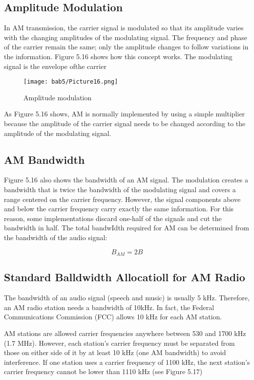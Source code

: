 \subsection{Amplitude Modulation}
In AM transmission, the carrier signal is modulated so that its amplitude varies with the changing amplitudes of the modulating signal. The frequency and phase of the carrier remain the same; only the amplitude changes to follow variations in the information. Figure 5.16 shows how this concept works. The modulating signal is the envelope ofthe carrier

\begin{figure}
  \centering
  \texttt{[image: bab5/Picture16.png]}
  \caption{Amplitude modulation}
  \label{fig5:16}
\end{figure}

As Figure 5.16 shows, AM is normally implemented by using a simple multiplier because the amplitude of the carrier signal needs to be changed according to the amplitude of the modulating signal.

\subsection*{AM Bandwidth}
Figure 5.16 also shows the bandwidth of an AM signal. The modulation creates a bandwidth that is twice the bandwidth of the modulating signal and covers a range centered on the carrier frequency. However, the signal components above and below the carrier frequency carry exactly the same information. For this reason, some implementations discard one-half of the signals and cut the bandwidth in half. The total bandwIdth required for AM can be determined from the bandwidth of the audio signal: 

\begin{equation}
  B_{AM} =2B
\end{equation}

\subsection*{Standard Balldwidth Allocatioll for AM Radio}
The bandwidth of an audio signal (speech and music) is usually 5 kHz. Therefore, an AM radio station needs a bandwidth of 10kHz. In fact, the Federal Communications Commission (FCC) allows 10 kHz for each AM station.

AM stations are allowed carrier frequencies anywhere between 530 and 1700 kHz (1.7 MHz). However, each station's carrier frequency must be separated from those on either side of it by at least 10 kHz (one AM bandwidth) to avoid interference. If one station uses a carrier frequency of 1100 kHz, the next station's carrier frequency cannot be lower than 1110 kHz (see Figure 5.17)

